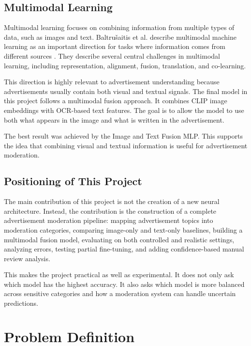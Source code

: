 \documentclass[12pt]{article}
\begin{document}
\subsection{Multimodal Learning}

Multimodal learning focuses on combining information from multiple types of data, such as images and text. Baltru\v{s}aitis et al. describe multimodal machine learning as an important direction for tasks where information comes from different sources \cite{baltrusaitis2019multimodal}. They describe several central challenges in multimodal learning, including representation, alignment, fusion, translation, and co-learning.

This direction is highly relevant to advertisement understanding because advertisements usually contain both visual and textual signals. The final model in this project follows a multimodal fusion approach. It combines CLIP image embeddings with OCR-based text features. The goal is to allow the model to use both what appears in the image and what is written in the advertisement.

The best result was achieved by the Image and Text Fusion MLP. This supports the idea that combining visual and textual information is useful for advertisement moderation.

\subsection{Positioning of This Project}

The main contribution of this project is not the creation of a new neural architecture. Instead, the contribution is the construction of a complete advertisement moderation pipeline: mapping advertisement topics into moderation categories, comparing image-only and text-only baselines, building a multimodal fusion model, evaluating on both controlled and realistic settings, analyzing errors, testing partial fine-tuning, and adding confidence-based manual review analysis.

This makes the project practical as well as experimental. It does not only ask which model has the highest accuracy. It also asks which model is more balanced across sensitive categories and how a moderation system can handle uncertain predictions.

\section{Problem Definition}
\end{document}
